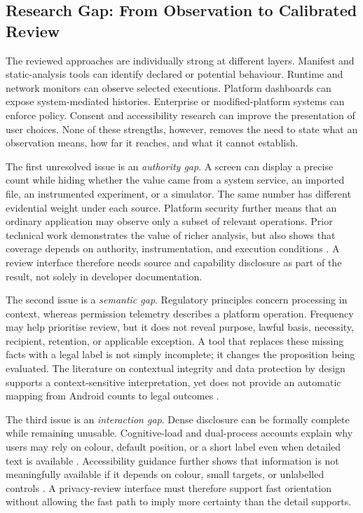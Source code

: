 \subsection{Research Gap: From Observation to Calibrated Review}

The reviewed approaches are individually strong at different layers. Manifest and static-analysis tools can identify declared or potential behaviour. Runtime and network monitors can observe selected executions. Platform dashboards can expose system-mediated histories. Enterprise or modified-platform systems can enforce policy. Consent and accessibility research can improve the presentation of user choices. None of these strengths, however, removes the need to state what an observation means, how far it reaches, and what it cannot establish.

The first unresolved issue is an \emph{authority gap}. A screen can display a precise count while hiding whether the value came from a system service, an imported file, an instrumented experiment, or a simulator. The same number has different evidential weight under each source. Platform security further means that an ordinary application may observe only a subset of relevant operations. Prior technical work demonstrates the value of richer analysis, but also shows that coverage depends on authority, instrumentation, and execution conditions \cite{49,androidpermissions2026}. A review interface therefore needs source and capability disclosure as part of the result, not solely in developer documentation.

The second issue is a \emph{semantic gap}. Regulatory principles concern processing in context, whereas permission telemetry describes a platform operation. Frequency may help prioritise review, but it does not reveal purpose, lawful basis, necessity, recipient, retention, or applicable exception. A tool that replaces these missing facts with a legal label is not simply incomplete; it changes the proposition being evaluated. The literature on contextual integrity and data protection by design supports a context-sensitive interpretation, yet does not provide an automatic mapping from Android counts to legal outcomes \cite{5,eurlex2016,edpb2019}.

The third issue is an \emph{interaction gap}. Dense disclosure can be formally complete while remaining unusable. Cognitive-load and dual-process accounts explain why users may rely on colour, default position, or a short label even when detailed text is available \cite{27,22}. Accessibility guidance further shows that information is not meaningfully available if it depends on colour, small targets, or unlabelled controls \cite{wcag22,androidaccess}. A privacy-review interface must therefore support fast orientation without allowing the fast path to imply more certainty than the detail supports.

